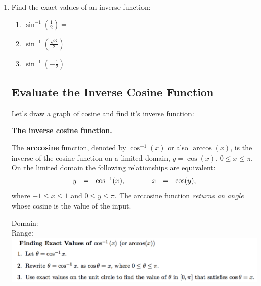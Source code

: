 \begin{enumerate}
\vspace{-.1in}
\item Find the exact values of an inverse function:

\begin{enumerate} 
\item $\displaystyle \sin^{-1}\left(\frac{1}{2}\right)=$\\[.5in]

\item $\displaystyle \sin^{-1}\left(\frac{\sqrt{3}}{2}\right)=$\\[.5in]

\item $\displaystyle \sin^{-1}\left(-\frac{1}{2}\right)=$\\[.5in]
\end{enumerate}




\subsection{Evaluate the Inverse Cosine Function}

Let's draw a graph of cosine and find it's inverse function:
\vfill

   \noindent\colorbox{blue!10}{%
   \parbox{\dimexpr\linewidth}%
   {%
     \textbf{The inverse cosine function.}

     The \textbf{arccosine} function, denoted by $\cos^{-1}(x)$ or
     also $\arccos(x)$, is the inverse of the cosine function on a
     limited domain, $y=\cos(x)$, $0 \leq x \leq \pi$. On the limited
     domain the following relationships are equivalent:
     \begin{eqnarray*}
       \begin{array}{rcl@{\hspace{4em}}rcl}
         y & = & \cos^{-1}(x), & x & = & \cos(y),
       \end{array}
     \end{eqnarray*}
     where $-1 \leq x \leq 1$ and $0 \leq y \leq \pi$. The arccosine
     function \textit{returns an angle} whose cosine is the value of
     the input.

     }
 }


\noindent Domain:\\[.5in]
\noindent Range:\\

\newpage
\includegraphics[scale=.7]{findingcosineinverse}\\





\end{enumerate}
